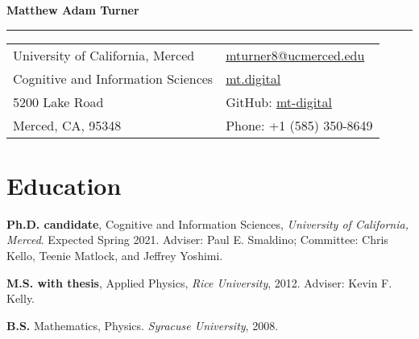 \documentclass[letterpaper,11pt,oneside]{article}
\begin{document}

\noindent  \textcolor{gunmetal}{\LARGE{\textbf{Matthew Adam Turner}}} \\
\vspace{-2ex}
\hrule 
\normalsize


\begin{center}
\begin{tabular}{l l}
 University of California, Merced & \hspace{1in} \href{mailto:mturner8@ucmerced.edu}{mturner8@ucmerced.edu} \\
 Cognitive and Information Sciences    & \hspace{1in}  \href{http://mt.digital}{mt.digital}   \\
  5200 Lake Road             & \hspace{1in} GitHub: \href{https://github.com/mt-digital}{mt-digital}  \\
 Merced, CA, 95348 & \hspace{1in} Phone: +1 (585) 350-8649 \\
\end{tabular}
\end{center}


\section*{\textcolor{gunmetal}{Education}}

  \begin{hangparas}{0.25in}{1}

    \textbf{Ph.D. candidate}, Cognitive and Information 
      Sciences, \emph{University of California, Merced}. Expected Spring 2021. Adviser: Paul E. Smaldino; Committee:
    Chris Kello, Teenie Matlock, and Jeffrey Yoshimi.

    \textbf{M.S. with thesis}, Applied Physics, \emph{Rice University}, 2012. Adviser: 
      Kevin F. Kelly.

    \textbf{B.S.} Mathematics, Physics. \emph{Syracuse University}, 2008.
  \end{hangparas}
\end{document}
